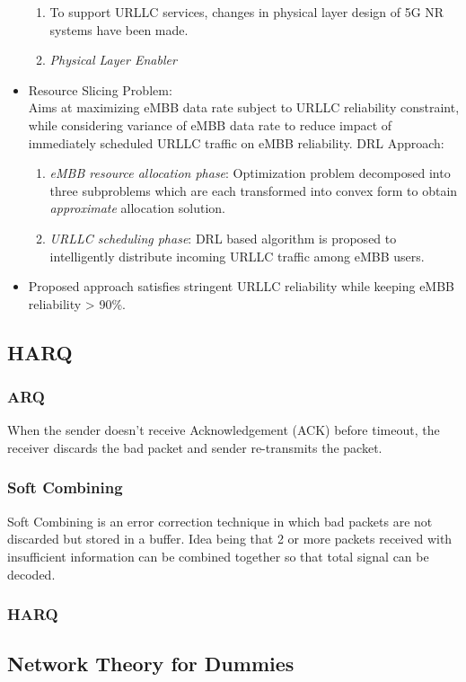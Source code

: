 \documentclass[11pt]{article}
\begin{document}
\begin{itemize}
\begin{enumerate}
\item To support URLLC services, changes in physical layer design of 5G NR systems have been made.
\item \emph{Physical Layer Enabler}
\end{enumerate}
\item Resource Slicing Problem: \\
Aims at maximizing eMBB data rate subject to URLLC reliability constraint, while considering variance of eMBB data rate to reduce impact of immediately scheduled URLLC traffic on eMBB reliability. DRL Approach:
\begin{enumerate}
\item \emph{eMBB resource allocation phase}: Optimization problem decomposed into three subproblems which are each transformed into convex form to obtain \emph{approximate} allocation solution.
\item \emph{URLLC scheduling phase}: DRL based algorithm is proposed to intelligently distribute incoming URLLC traffic among eMBB users.
\end{enumerate}
\item Proposed approach satisfies stringent URLLC reliability while keeping eMBB reliability > 90\%.
\end{itemize}
\subsection{HARQ}
\label{sec:org75c33d9}
\subsubsection{ARQ}
\label{sec:org8daea7b}
When the  sender doesn’t receive Acknowledgement (ACK) before timeout, the receiver discards the bad packet and sender re-transmits the packet.
\subsubsection{Soft Combining}
\label{sec:orgeab692f}
Soft Combining is an error correction technique in which bad packets are not discarded but stored in a buffer. Idea being that 2 or more packets received with insufficient information can be combined together so that total signal can be decoded.
\subsubsection{HARQ}
\label{sec:org4abff98}
\subsection{Network Theory for Dummies}
\label{sec:orga109c59}
\end{document}
